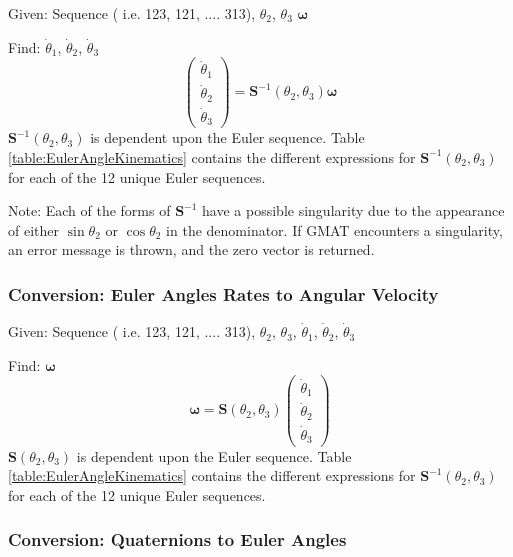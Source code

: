 Given:  Sequence ( i.e. 123, 121, .... 313), $\theta_2$,
$\theta_3$ $\boldsymbol\omega$

\noindent Find: $\dot\theta_1$, $\dot\theta_2$, $\dot\theta_3$
%
\begin{equation}
    \begin{pmatrix}
         \dot\theta_1\\
         \dot\theta_2\\
         \dot\theta_3
    \end{pmatrix}
    = \mathbf{S}^{-1}(\theta_2,\theta_3)\boldsymbol\omega
\end{equation}
%
$\mathbf{S}^{-1}(\theta_2,\theta_3)$ is dependent upon the Euler
sequence.  Table \ref{table:EulerAngleKinematics} contains the
different expressions for $\mathbf{S}^{-1}(\theta_2,\theta_3)$ for
each of the 12 unique Euler sequences.

Note:  Each of the forms of $\mathbf{S}^{-1}$ have a possible
singularity due to the appearance of either $\sin{\theta_2}$ or
$\cos{\theta_2}$ in the denominator.  If GMAT encounters a
singularity, an error message is thrown, and the zero vector is
returned.

\subsubsection{Conversion:  Euler Angles Rates to Angular Velocity}

\noindent Given: Sequence ( i.e. 123, 121, .... 313), $\theta_2$,
$\theta_3$, $\dot\theta_1$, $\dot\theta_2$, $\dot\theta_3$

\noindent Find: $\boldsymbol\omega$
%
\begin{equation}
    \boldsymbol\omega = \mathbf{S}(\theta_2,\theta_3)
        \begin{pmatrix}
         \dot\theta_1\\
         \dot\theta_2\\
         \dot\theta_3
    \end{pmatrix}
\end{equation}
%
$\mathbf{S}(\theta_2,\theta_3)$ is dependent upon the Euler
sequence.  Table \ref{table:EulerAngleKinematics} contains the
different expressions for $\mathbf{S}^{-1}(\theta_2,\theta_3)$ for
each of the 12 unique Euler sequences.

\subsubsection{Conversion:  Quaternions to Euler Angles}

